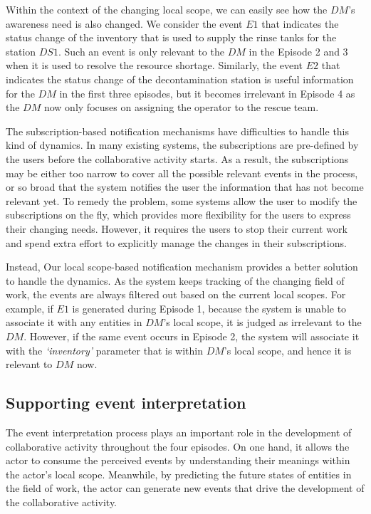 Within the context of the changing local scope, we can easily see how the $DM$'s awareness need is also changed. We consider the event $E1$ that indicates the status change of the inventory that is used to supply the rinse tanks for the station $DS1$. Such an event is only relevant to the $DM$ in the Episode 2 and 3 when it is used to resolve the resource shortage. Similarly, the event $E2$ that indicates the status change of the decontamination station is useful information for the $DM$ in the first three episodes, but it becomes irrelevant in Episode 4 as the $DM$ now only focuses on assigning the operator to the rescue team.

The subscription-based notification mechanisms have difficulties to handle this kind of dynamics. In many existing systems, the subscriptions are pre-defined by the users before the collaborative activity starts. As a result, the subscriptions may be either too narrow to cover all the possible relevant events in the process, or so broad that the system notifies the user the information that has not become relevant yet. To remedy the problem, some systems allow the user to modify the subscriptions on the fly, which provides more flexibility for the users to express their changing needs. However, it requires the users to stop their current work and spend extra effort to explicitly manage the changes in their subscriptions.

Instead, Our local scope-based notification mechanism provides a better solution to handle the dynamics. As the system keeps tracking of the changing field of work, the events are always filtered out based on the current local scopes. For example, if $E1$ is generated during Episode 1, because the system is unable to associate it with any entities in $DM$'s local scope, it is judged as irrelevant to the $DM$. However, if the same event occurs in Episode 2, the system will associate it with the \emph{`inventory'} parameter that is within $DM$'s local scope, and hence it is relevant to $DM$ now.

\subsection{Supporting event interpretation} %
\label{sub:supporting_event_interpretation}
The event interpretation process plays an important role in the development of collaborative activity throughout the four episodes. On one hand, it allows the actor to consume the perceived events by understanding their meanings within the actor’s local scope. Meanwhile, by predicting the future states of entities in the field of work, the actor can generate new events that drive the development of the collaborative activity. 

